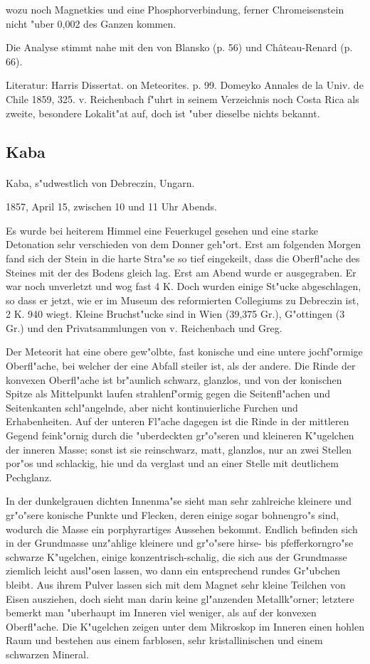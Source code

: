 \documentclass[a4paper, 11pt, oneside]{article}
\begin{document}
wozu noch Magnetkies und eine Phosphorverbindung, ferner Chromeisenstein nicht "uber 0,002 des Ganzen kommen.

Die Analyse stimmt nahe mit den von Blansko (p. 56) und Château-Renard (p. 66).

\footnotesize
Literatur: Harris Dissertat. on Meteorites. p. 99. Domeyko Annales de la Univ. de Chile 1859, 325. v. Reichenbach f"uhrt in seinem Verzeichnis noch Costa Rica als zweite, besondere Lokalit"at auf, doch ist "uber dieselbe nichts bekannt.

\subsection{Kaba}
\normalsize
\paragraph{}
Kaba, s"udwestlich von Debreczin, Ungarn.

1857, April 15, zwischen 10 und 11 Uhr Abends.

Es wurde bei heiterem Himmel eine Feuerkugel gesehen und eine starke Detonation sehr verschieden von dem Donner geh"ort. Erst am folgenden Morgen fand sich der Stein in die harte Stra"se so tief eingekeilt, dass die Oberfl"ache des Steines mit der des Bodens gleich lag. Erst am Abend wurde er ausgegraben. Er war noch unverletzt und wog fast 4 K. Doch wurden einige St"ucke abgeschlagen, so dass er jetzt, wie er im Museum des reformierten Collegiums zu Debreczin ist, 2 K. 940 wiegt. Kleine Bruchst"ucke sind in Wien (39,375 Gr.), G"ottingen (3 Gr.) und den Privatsammlungen von v. Reichenbach und Greg.

Der Meteorit hat eine obere gew"olbte, fast konische und eine untere jochf"ormige Oberfl"ache, bei welcher der eine Abfall steiler ist, als der andere. Die Rinde der konvexen Oberfl"ache ist br"aunlich schwarz, glanzlos, und von der konischen Spitze als Mittelpunkt laufen strahlenf"ormig gegen die Seitenfl"achen und Seitenkanten schl"angelnde, aber nicht kontinuierliche Furchen und Erhabenheiten. Auf der unteren Fl"ache dagegen ist die Rinde in der mittleren Gegend feink"ornig durch die "uberdeckten gr"o"seren und kleineren K"ugelchen der inneren Masse; sonst ist sie reinschwarz, matt, glanzlos, nur an zwei Stellen por"os und schlackig, hie und da verglast und an einer Stelle mit deutlichem Pechglanz.

In der dunkelgrauen dichten Innenma"se sieht man sehr zahlreiche kleinere und gr"o"sere konische Punkte und Flecken, deren einige sogar bohnengro"s sind, wodurch die Masse ein porphyrartiges Aussehen bekommt. Endlich befinden sich in der Grundmasse unz"ahlige kleinere und gr"o"sere hirse- bis pfefferkorngro"se schwarze K"ugelchen, einige konzentrisch-schalig, die sich aus der Grundmasse ziemlich leicht ausl"osen lassen, wo dann ein entsprechend rundes Gr"ubchen bleibt. Aus ihrem Pulver lassen sich mit dem Magnet sehr kleine Teilchen von Eisen ausziehen, doch sieht man darin keine gl"anzenden Metallk"orner; letztere bemerkt man "uberhaupt im Inneren viel weniger, als auf der konvexen Oberfl"ache. Die K"ugelchen zeigen unter dem Mikroskop im Inneren einen hohlen Raum und bestehen aus einem farblosen, sehr kristallinischen und einem schwarzen Mineral.
\end{document}
